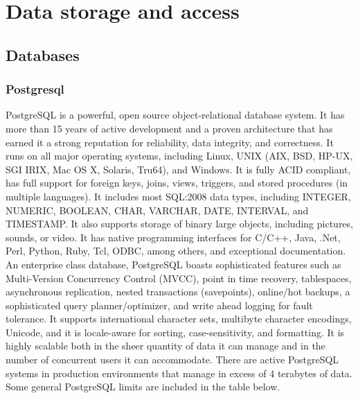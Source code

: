
\chapter{Data storage and access}


\section{Databases}

\subsection{Postgresql}

PostgreSQL is a powerful, open source object-relational database system. It has more than 15 years of active development and a proven architecture that has earned it a strong reputation for reliability, data integrity, and correctness. It runs on all major operating systems, including Linux, UNIX (AIX, BSD, HP-UX, SGI IRIX, Mac OS X, Solaris, Tru64), and Windows. It is fully ACID compliant, has full support for foreign keys, joins, views, triggers, and stored procedures (in multiple languages). It includes most SQL:2008 data types, including INTEGER, NUMERIC, BOOLEAN, CHAR, VARCHAR, DATE, INTERVAL, and TIMESTAMP. It also supports storage of binary large objects, including pictures, sounds, or video. It has native programming interfaces for C/C++, Java, .Net, Perl, Python, Ruby, Tcl, ODBC, among others, and exceptional documentation. \\

An enterprise class database, PostgreSQL boasts sophisticated features such as Multi-Version Concurrency Control (MVCC), point in time recovery, tablespaces, asynchronous replication, nested transactions (savepoints), online/hot backups, a sophisticated query planner/optimizer, and write ahead logging for fault tolerance. It supports international character sets, multibyte character encodings, Unicode, and it is locale-aware for sorting, case-sensitivity, and formatting. It is highly scalable both in the sheer quantity of data it can manage and in the number of concurrent users it can accommodate. There are active PostgreSQL systems in production environments that manage in excess of 4 terabytes of data. Some general PostgreSQL limits are included in the table below.\\

